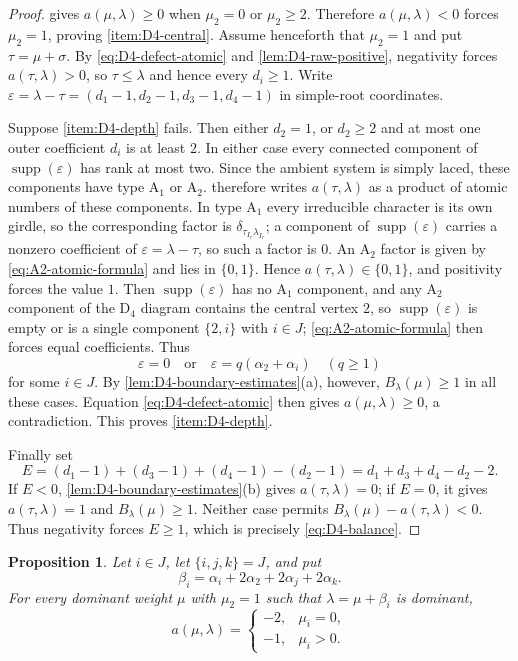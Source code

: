 \documentclass[11pt]{article}
\newtheorem{proposition}[proposition]{Proposition}
\theoremstyle{definition}
\theoremstyle{remark}
\newcommand{\supp}{\operatorname{supp}}
\newcommand{\typeA}{\ensuremath{\mathrm{A}}}
\newcommand{\typeD}{\ensuremath{\mathrm{D}}}
\begin{document}
\begin{proof}
 gives
$a(\mu,\lambda)\ge0$ when $\mu_2=0$ or $\mu_2\ge2$.  Therefore
$a(\mu,\lambda)<0$ forces $\mu_2=1$, proving
\ref{item:D4-central}.
Assume henceforth that $\mu_2=1$ and put $\tau=\mu+\sigma$.
By \eqref{eq:D4-defect-atomic} and \cref{lem:D4-raw-positive}, negativity
forces $a(\tau,\lambda)>0$, so $\tau\le\lambda$ and hence every $d_i\ge1$.
Write $\varepsilon=\lambda-\tau=(d_1-1,d_2-1,d_3-1,d_4-1)$ in simple-root
coordinates.

Suppose \ref{item:D4-depth} fails.  Then either $d_2=1$, or $d_2\ge2$ and at
most one outer coefficient $d_i$ is at least $2$.  In either case every
connected component of $\supp(\varepsilon)$ has rank at most two.  Since the
ambient system is simply laced, these components have type $\typeA_1$ or $\typeA_2$.
 therefore writes $a(\tau,\lambda)$ as a product
of atomic numbers of these components.  In type $\typeA_1$ every irreducible
character is its own girdle, so the corresponding factor is
$\delta_{\tau_{I_r}\lambda_{I_r}}$; a component of $\supp(\varepsilon)$
carries a nonzero coefficient of $\varepsilon=\lambda-\tau$, so such a factor
is $0$.  An $\typeA_2$ factor is given by \eqref{eq:A2-atomic-formula} and
lies in $\{0,1\}$.  Hence
$a(\tau,\lambda)\in\{0,1\}$, and positivity forces the value $1$.  Then
$\supp(\varepsilon)$ has no $\typeA_1$ component, and any $\typeA_2$
component of the $\typeD_4$ diagram contains the central vertex $2$, so
$\supp(\varepsilon)$ is empty or is a single component $\{2,i\}$ with
$i\in J$; \eqref{eq:A2-atomic-formula} then forces equal coefficients.  Thus
\[
       \varepsilon=0
       \quad\text{or}\quad
       \varepsilon=q(\alpha_2+\alpha_i)
       \quad(q\ge1)
\]
for some $i\in J$.  By \cref{lem:D4-boundary-estimates}(a), however,
$B_\lambda(\mu)\ge1$ in all these cases.  Equation
\eqref{eq:D4-defect-atomic} then gives $a(\mu,\lambda)\ge0$, a contradiction.
This proves \ref{item:D4-depth}.

Finally set
\[
 E=(d_1-1)+(d_3-1)+(d_4-1)-(d_2-1)
   =d_1+d_3+d_4-d_2-2.
\]
If $E<0$, \cref{lem:D4-boundary-estimates}(b) gives
$a(\tau,\lambda)=0$; if $E=0$, it gives
$a(\tau,\lambda)=1$ and $B_\lambda(\mu)\ge1$.  Neither case permits
$B_\lambda(\mu)-a(\tau,\lambda)<0$.  Thus negativity forces $E\ge1$, which
is precisely \eqref{eq:D4-balance}.
\end{proof}

\begin{proposition}\label{prop:D4-minimal-family}
Let $i\in J$, let $\{i,j,k\}=J$, and put
\[
 \beta_i=\alpha_i+2\alpha_2+2\alpha_j+2\alpha_k.
\]
For every dominant weight $\mu$ with $\mu_2=1$ such that
$\lambda=\mu+\beta_i$ is dominant,
\begin{equation}\label{eq:D4-minimal-family}
 a(\mu,\lambda)=
 \begin{cases}
 -2,&\mu_i=0,\\
 -1,&\mu_i>0.
 \end{cases}
\end{equation}
\end{proposition}
\end{document}
